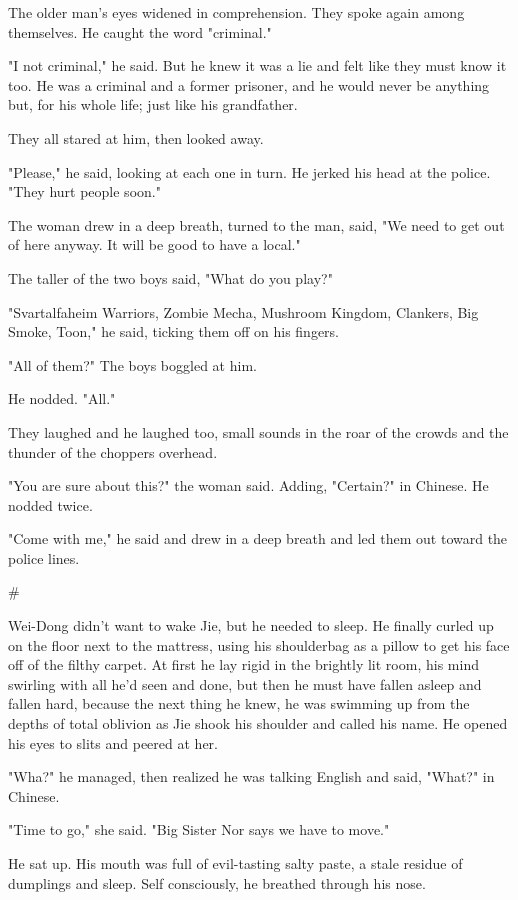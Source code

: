 The older man's eyes widened in comprehension. They spoke again
among themselves. He caught the word "criminal."

"I not criminal," he said. But he knew it was a lie and felt like
they must know it too. He was a criminal and a former prisoner, and
he would never be anything but, for his whole life; just like his
grandfather.

They all stared at him, then looked away.

"Please," he said, looking at each one in turn. He jerked his head
at the police. "They hurt people soon."

The woman drew in a deep breath, turned to the man, said, "We need
to get out of here anyway. It will be good to have a local."

The taller of the two boys said, "What do you play?"

"Svartalfaheim Warriors, Zombie Mecha, Mushroom Kingdom, Clankers,
Big Smoke, Toon," he said, ticking them off on his fingers.

"All of them?" The boys boggled at him.

He nodded. "All."

They laughed and he laughed too, small sounds in the roar of the
crowds and the thunder of the choppers overhead.

"You are sure about this?" the woman said. Adding, "Certain?" in
Chinese. He nodded twice.

"Come with me," he said and drew in a deep breath and led them out
toward the police lines.

\#

Wei-Dong didn't want to wake Jie, but he needed to sleep. He
finally curled up on the floor next to the mattress, using his
shoulderbag as a pillow to get his face off of the filthy carpet.
At first he lay rigid in the brightly lit room, his mind swirling
with all he'd seen and done, but then he must have fallen asleep
and fallen hard, because the next thing he knew, he was swimming up
from the depths of total oblivion as Jie shook his shoulder and
called his name. He opened his eyes to slits and peered at her.

"Wha?" he managed, then realized he was talking English and said,
"What?" in Chinese.

"Time to go," she said. "Big Sister Nor says we have to move."

He sat up. His mouth was full of evil-tasting salty paste, a stale
residue of dumplings and sleep. Self consciously, he breathed
through his nose.

